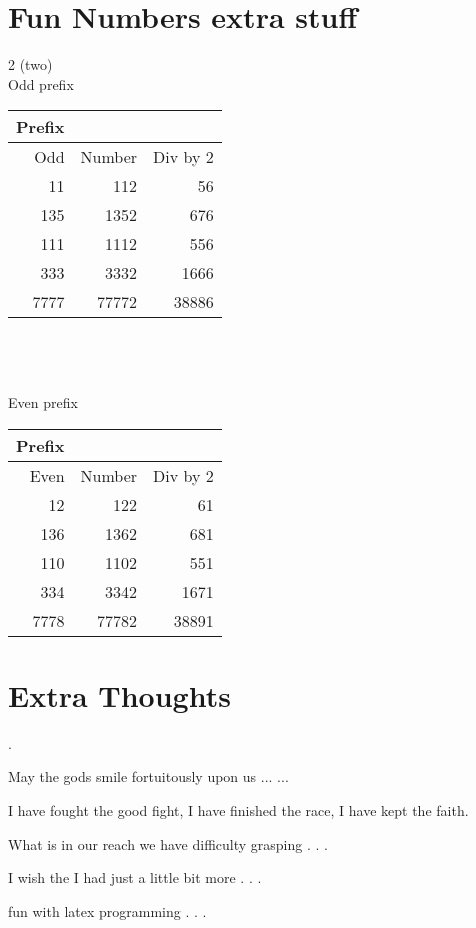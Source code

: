 \documentclass[12pt,letterpaper,oneside,titlepage]{article}
\begin{document}
\section{Fun Numbers  extra stuff}
\par 
2 (two)
\\
Odd prefix
\begin{tabular}{|r|r|r|}
	\hline
	Prefix&       &           \\
	\hline
	Odd   & Number&  Div by 2 \\
	\hline
	11    & 112   &  56       \\
	\hline
	135   & 1352  &  676      \\
	\hline
	111   & 1112  &  556      \\
	\hline
	333   & 3332  &  1666     \\
	\hline
	7777  & 77772 &  38886    \\
	\hline                    
\end{tabular} 
\\
\\
\\
Even prefix
\begin{tabular}{|r|r|r}
	\hline
	Prefix&       &           \\
	\hline
	Even   & Number&  Div by 2 \\
	\hline
	12    & 122   &  61       \\
	\hline
	136   & 1362  &  681      \\
	\hline
	110   & 1102  &  551      \\
	\hline
	334   & 3342  &  1671     \\
	\hline
	7778  & 77782 &  38891    \\
	\hline                    
\end{tabular} 

\pagebreak
\section{Extra Thoughts}
.
\\
\par
May the gods smile fortuitously upon us ... ...
\\
\par
I have fought the good fight, I have finished the race, I have kept the faith.
\\
\par 
What is in our reach we have difficulty grasping . . .
\\
\par
I wish the I had just a little bit more . . .
\\
\par 
fun with latex programming . . .
\pagebreak
\end{document}
